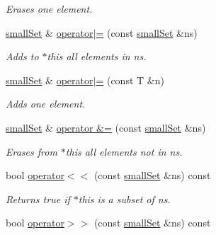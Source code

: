 \begin{CompactItemize}
\begin{CompactList}\small\item\em Erases one element. \item\end{CompactList}\item 
\hypertarget{classdai_1_1smallSet_c2e95c8464389c28d989a7e2013999ed}{
\hyperlink{classdai_1_1smallSet}{smallSet} \& \hyperlink{classdai_1_1smallSet_c2e95c8464389c28d989a7e2013999ed}{operator$|$=} (const \hyperlink{classdai_1_1smallSet}{smallSet} \&ns)}
\label{classdai_1_1smallSet_c2e95c8464389c28d989a7e2013999ed}

\begin{CompactList}\small\item\em Adds to $\ast$this all elements in ns. \item\end{CompactList}\item 
\hypertarget{classdai_1_1smallSet_3ab8465276b9f0533b7f641c87dca9e9}{
\hyperlink{classdai_1_1smallSet}{smallSet} \& \hyperlink{classdai_1_1smallSet_3ab8465276b9f0533b7f641c87dca9e9}{operator$|$=} (const T \&n)}
\label{classdai_1_1smallSet_3ab8465276b9f0533b7f641c87dca9e9}

\begin{CompactList}\small\item\em Adds one element. \item\end{CompactList}\item 
\hypertarget{classdai_1_1smallSet_dfcfeeb334b9f46115185c9320ba655b}{
\hyperlink{classdai_1_1smallSet}{smallSet} \& \hyperlink{classdai_1_1smallSet_dfcfeeb334b9f46115185c9320ba655b}{operator \&=} (const \hyperlink{classdai_1_1smallSet}{smallSet} \&ns)}
\label{classdai_1_1smallSet_dfcfeeb334b9f46115185c9320ba655b}

\begin{CompactList}\small\item\em Erases from $\ast$this all elements not in ns. \item\end{CompactList}\item 
\hypertarget{classdai_1_1smallSet_6cd0a2ffbbad14020999cf11199e1e95}{
bool \hyperlink{classdai_1_1smallSet_6cd0a2ffbbad14020999cf11199e1e95}{operator$<$$<$} (const \hyperlink{classdai_1_1smallSet}{smallSet} \&ns) const }
\label{classdai_1_1smallSet_6cd0a2ffbbad14020999cf11199e1e95}

\begin{CompactList}\small\item\em Returns true if $\ast$this is a subset of ns. \item\end{CompactList}\item 
\hypertarget{classdai_1_1smallSet_49518998a31f63cf7a725937da3f2b6e}{
bool \hyperlink{classdai_1_1smallSet_49518998a31f63cf7a725937da3f2b6e}{operator$>$$>$} (const \hyperlink{classdai_1_1smallSet}{smallSet} \&ns) const }
\label{classdai_1_1smallSet_49518998a31f63cf7a725937da3f2b6e}


\end{CompactItemize}
